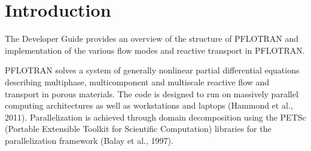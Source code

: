 \documentclass[12pt]{article}
\begin{document}
\vfill

\normalsize

\clearpage

\tableofcontents



\clearpage


\section{Introduction}

The Developer Guide provides an overview of the structure of PFLOTRAN and implementation of the various flow modes and reactive transport in PFLOTRAN.

PFLOTRAN solves a system of generally nonlinear partial differential equations describing multiphase, multicomponent and multiscale reactive flow and transport in porous materials. The code is designed to run on massively parallel computing architectures as well as workstations and laptops (Hammond et al., 2011). Parallelization is achieved through domain decomposition using the PETSc (Port\-a\-ble Extensible Toolkit for Scientific Computation) libraries for the parallelization framework  (Balay et al., 1997).
\end{document}
